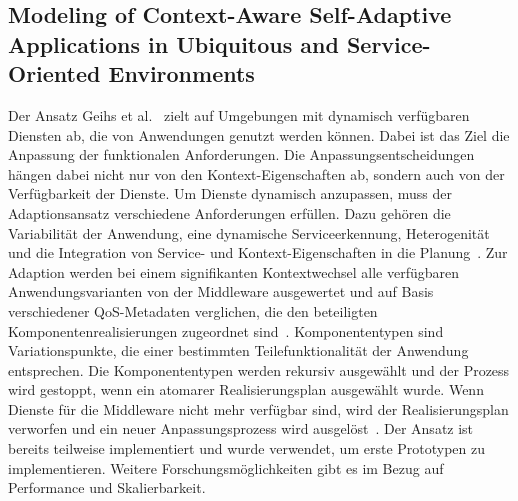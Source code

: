 \documentclass[conference,compsoc]{IEEEtran}
\begin{document}
\subsection{Modeling of Context-Aware Self-Adaptive Applications in Ubiquitous and Service-Oriented Environments}
Der Ansatz Geihs et al.~\cite{geihs2009modeling} zielt auf Umgebungen mit dynamisch verfügbaren Diensten ab, die von Anwendungen genutzt werden können. Dabei ist das Ziel die Anpassung der funktionalen Anforderungen. Die Anpassungsentscheidungen hängen dabei nicht nur von den Kontext-Eigenschaften ab, sondern auch von der Verfügbarkeit der Dienste. Um Dienste dynamisch anzupassen, muss der Adaptionsansatz verschiedene Anforderungen erfüllen. Dazu gehören die Variabilität der Anwendung, eine dynamische Serviceerkennung, Heterogenität und die Integration von Service- und Kontext-Eigenschaften in die Planung~\cite{geihs2009modeling}.
Zur Adaption werden bei einem signifikanten Kontextwechsel alle verfügbaren Anwendungsvarianten von der Middleware ausgewertet und auf Basis verschiedener QoS-Metadaten verglichen, die den beteiligten Komponentenrealisierungen zugeordnet sind~\cite{geihs2009modeling}. Komponententypen sind Variationspunkte, die einer bestimmten Teilefunktionalität der Anwendung entsprechen. Die Komponententypen werden rekursiv ausgewählt und der Prozess wird gestoppt, wenn ein atomarer Realisierungsplan ausgewählt wurde.
Wenn Dienste für die Middleware nicht mehr verfügbar sind, wird der Realisierungsplan verworfen und ein neuer Anpassungsprozess wird ausgelöst~\cite{geihs2009modeling}.
Der Ansatz ist bereits teilweise implementiert und wurde verwendet, um erste Prototypen zu implementieren. Weitere Forschungsmöglichkeiten gibt es im Bezug auf Performance und Skalierbarkeit.
\end{document}
